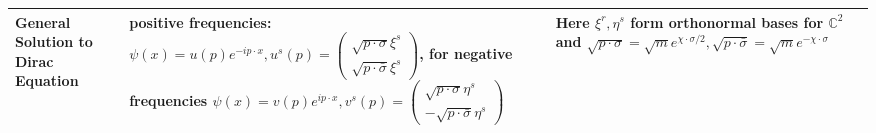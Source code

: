 \documentclass{article}
\theoremstyle{definition}
\begin{document}
\begin{table}[H]
\begin{adjustbox}{center}
\begin{tabular}{|p{5cm}|p{10cm}|p{5cm}|}
      General Solution to Dirac Equation &
      positive frequencies: $\psi(x) = u(p) e^{-i p \cdot x}, u^s(p) = \begin{pmatrix} \sqrt{p \cdot \sigma} \xi^s \\ \sqrt{p \cdot \bar{\sigma}} \xi^s \end{pmatrix}$,
      for negative frequencies $\psi(x) = v(p) e^{ip \cdot x}, v^s(p) = \begin{pmatrix} \sqrt{p \cdot \sigma} \eta^s \\ -\sqrt{p \cdot \bar{\sigma}} \eta^s \end{pmatrix}$ &
      Here $\xi^r, \eta^s$ form orthonormal bases for $\mathbb{C}^2$ and
      $\sqrt{p \cdot \sigma} = \sqrt{m} e^{\chi \cdot \sigma / 2}, \sqrt{p \cdot \bar{\sigma}} = \sqrt{m} e^{-\chi \cdot \sigma}$ \\ \hline
    \end{tabular}
  \end{adjustbox}
\end{table}
\end{document}

